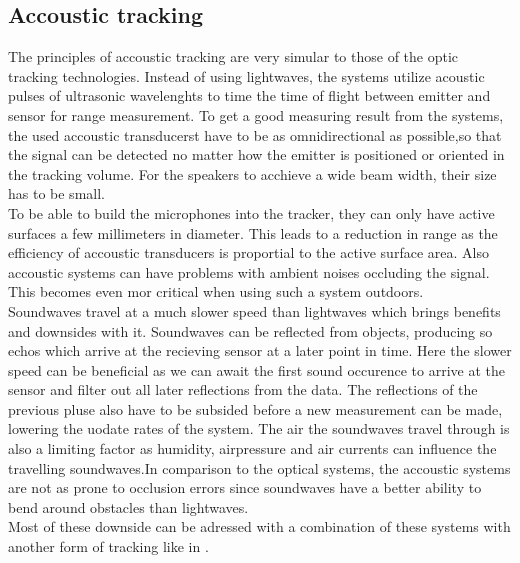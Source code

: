 \subsection{Accoustic tracking}
The principles of accoustic tracking are very simular to those of the optic tracking technologies. Instead of using lightwaves, the systems utilize acoustic pulses of ultrasonic wavelenghts to time the time of flight between emitter and sensor for range measurement. To get a good measuring result from the systems, the used accoustic transducerst have to be as omnidirectional as possible,so that the signal can be detected no matter how the emitter is positioned or oriented in the tracking volume. For the speakers to acchieve a wide beam width, their size has to be small.\\ To be able to build the microphones into the tracker, they can only have active surfaces a few millimeters in diameter. This leads to a reduction in range as the efficiency of accoustic transducers is proportial to the active surface area. Also accoustic systems can have problems with ambient noises occluding the signal. This becomes even mor critical when using such a system outdoors.\\Soundwaves travel at a much slower speed than lightwaves which brings benefits and downsides with it. Soundwaves can be reflected from objects, producing so echos which arrive at the recieving sensor at a later point in time. Here the slower speed can be beneficial as we can await the first sound occurence to arrive at the sensor and filter out all later reflections from the data. The reflections of the previous pluse also have to be subsided before a new measurement can be made, lowering the uodate rates of the system. The air the soundwaves travel through is also a limiting factor as humidity, airpressure and air currents can influence the travelling soundwaves.In comparison to the optical systems, the accoustic systems are not as prone to occlusion errors since soundwaves have a better ability to bend around obstacles  than lightwaves.
\\Most of these downside can be adressed with a combination of these systems with another form of tracking like in \cite{Foxlin.1998}.
